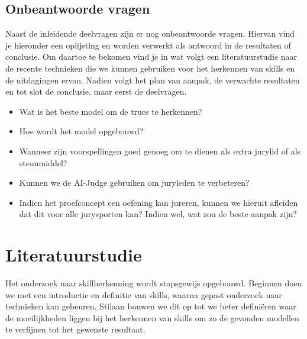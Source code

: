 \subsection{Onbeantwoorde vragen}

Naast de inleidende deelvragen zijn er nog onbeantwoorde vragen. Hiervan vind je hieronder een oplijsting en worden verwerkt als antwoord in de resultaten of conclusie. Om daartoe te bekomen vind je in wat volgt een literatuurstudie naar de recente technieken die we kunnen gebruiken voor het herkennen van skills en de uitdagingen ervan. Nadien volgt het plan van aanpak, de verwachte resultaten en tot slot de conclusie, maar eerst de deelvragen.

\begin{itemize}
    \item Wat is het beste model om de trucs te herkennen?
    \item Hoe wordt het model opgebouwd?
    \item Wanneer zijn voorspellingen goed genoeg om te dienen als extra jurylid of als steunmiddel?
    \item Kunnen we de AI-Judge gebruiken om juryleden te verbeteren?
    \item Indien het proefconcept een oefening kan jureren, kunnen we hieruit afleiden dat dit voor alle jurysporten kan? Indien wel, wat zou de beste aanpak zijn?
\end{itemize}


\section{Literatuurstudie}%
\label{sec:literatuurstudie}


    
Het onderzoek naar skillherkenning wordt stapsgewijs opgebouwd. Beginnen doen we met een introductie en definitie van skills, waarna gepast onderzoek naar technieken kan gebeuren. Stilaan bouwen we dit op tot we beter definiëren waar de moeilijkheden liggen bij het herkennen van skills om zo de gevonden modellen te verfijnen tot het gewenste resultaat.

